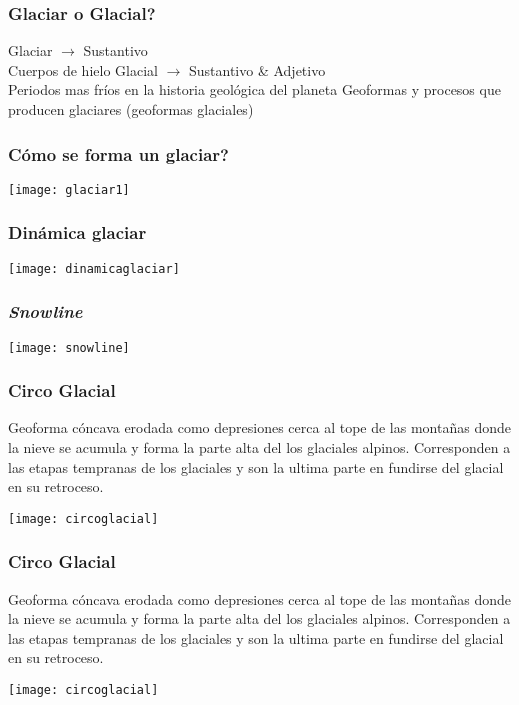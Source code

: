\documentclass{beamer}
\begin{document}
\begin{frame}
\frametitle{Glaciar o Glacial?}
Glaciar $\rightarrow$ Sustantivo\\
Cuerpos de hielo
\vfill 
Glacial $\rightarrow$ Sustantivo \& Adjetivo\\
Periodos mas fríos en la historia geológica del planeta
Geoformas y procesos que producen glaciares (geoformas glaciales)
\end{frame}
\begin{frame}
\frametitle{Cómo se forma un glaciar?}
\begin{center}
\texttt{[image: glaciar1]}
\end{center}
\end{frame}
\begin{frame}
\frametitle{Dinámica glaciar}
\begin{center}
\texttt{[image: dinamicaglaciar]}
\end{center}
\end{frame}
\begin{frame}
\frametitle{\emph{Snowline}}
\begin{center}
\texttt{[image: snowline]}
\end{center}
\end{frame}
\begin{frame}
\frametitle{Circo Glacial}
\small{Geoforma cóncava erodada como depresiones cerca al tope de las montañas donde la nieve se acumula y forma la parte alta del los glaciales alpinos. Corresponden a las etapas tempranas de los glaciales y son la ultima parte en fundirse del glacial en su retroceso.}
\begin{center}
\texttt{[image: circoglacial]}
\end{center}
\end{frame}
\begin{frame}
\frametitle{Circo Glacial}
\justifying
\small{Geoforma cóncava erodada como depresiones cerca al tope de las montañas donde la nieve se acumula y forma la parte alta del los glaciales alpinos. Corresponden a las etapas tempranas de los glaciales y son la ultima parte en fundirse del glacial en su retroceso.}
\begin{center}
\texttt{[image: circoglacial]}
\end{center}
\end{frame}
\end{document}

